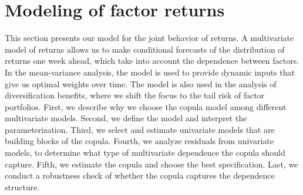 
\section{Modeling of factor returns} %
\label{sec:modeling_of_factor_returns}

This section presents our model for the joint behavior of returns. A multivariate model of returns allows us to make conditional forecasts of the distribution of returns one week ahead, which take into account the dependence between factors. In the mean-variance analysis, the model is used to provide dynamic inputs that give us optimal weights over time. The model is also used in the analysis of diversification benefits, where we shift the focus to the tail risk of factor portfolios. First, we describe why we choose the copula model among different multivariate models. Second, we define the model and interpret the parameterization. Third, we select and estimate univariate models that are building blocks of the copula. Fourth, we analyze residuals from univariate models, to determine what type of multivariate dependence the copula should capture. Fifth, we estimate the copula and choose the best specification. Last, we conduct a robustness check of whether the copula captures the dependence structure.







